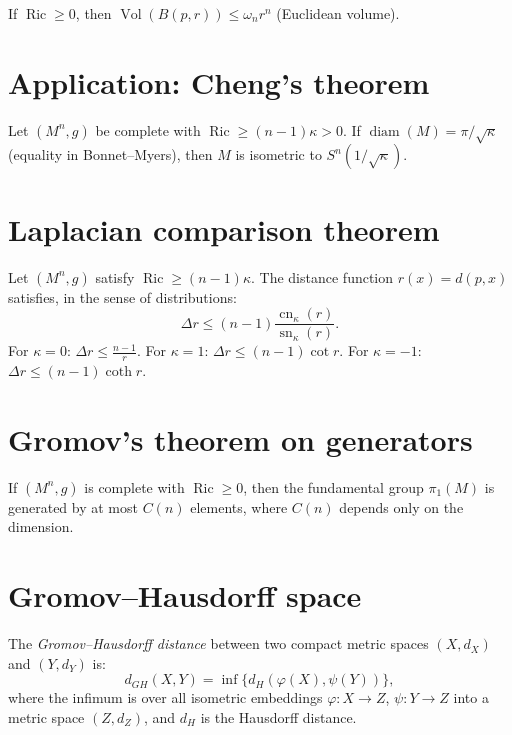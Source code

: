 \begin{corollary}
If $\operatorname{Ric} \geq 0$, then
$\operatorname{Vol}(B(p, r)) \leq \omega_n r^n$ (Euclidean volume).
\end{corollary}

\section{Application: Cheng's theorem}

\begin{theorem}[Cheng]
Let $(M^n, g)$ be complete with $\operatorname{Ric} \geq (n-1)\kappa > 0$.
If $\operatorname{diam}(M) = \pi/\sqrt{\kappa}$ (equality in Bonnet--Myers),
then $M$ is isometric to $S^n(1/\sqrt{\kappa})$.
\end{theorem}

\section{Laplacian comparison theorem}

\begin{theorem}
Let $(M^n, g)$ satisfy $\operatorname{Ric} \geq (n-1)\kappa$. The distance function
$r(x) = d(p, x)$ satisfies, in the sense of distributions:
\[
    \Delta r \leq (n-1)\frac{\operatorname{cn}_\kappa(r)}{\operatorname{sn}_\kappa(r)}.
\]
For $\kappa = 0$: $\Delta r \leq \frac{n-1}{r}$.
For $\kappa = 1$: $\Delta r \leq (n-1)\cot r$.
For $\kappa = -1$: $\Delta r \leq (n-1)\coth r$.
\end{theorem}

\section{Gromov's theorem on generators}

\begin{theorem}[Gromov]
If $(M^n, g)$ is complete with $\operatorname{Ric} \geq 0$, then the fundamental
group $\pi_1(M)$ is generated by at most $C(n)$ elements, where $C(n)$ depends
only on the dimension.
\end{theorem}

\section{Gromov--Hausdorff space}

\begin{definition}
The \emph{Gromov--Hausdorff distance} between two compact metric spaces
$(X, d_X)$ and $(Y, d_Y)$ is:
\[
    d_{GH}(X, Y) = \inf \{ d_H(\varphi(X), \psi(Y)) \},
\]
where the infimum is over all isometric embeddings $\varphi : X \to Z$,
$\psi : Y \to Z$ into a metric space $(Z, d_Z)$, and $d_H$ is the Hausdorff
distance.
\end{definition}

